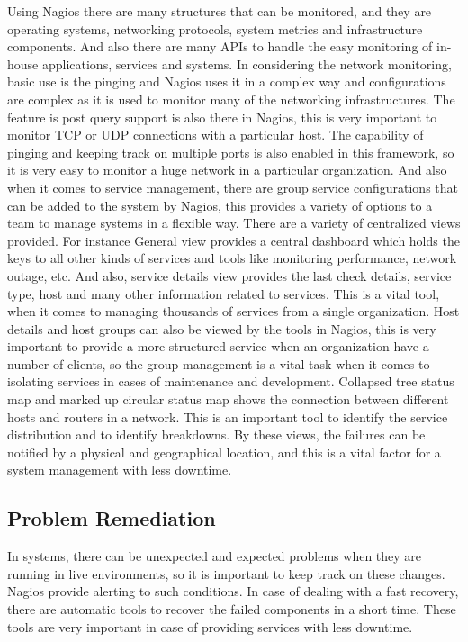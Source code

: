 \documentclass[9pt,twocolumn,twoside]{styles/osajnl}
\begin{document}
Using Nagios there are many structures that can be monitored, and they are operating systems, networking protocols, system metrics and infrastructure components. And also there are many APIs to handle the easy monitoring of in-house applications, services and systems. In considering the network monitoring, basic use is the pinging and Nagios uses it in a complex way and configurations are complex as it is used to monitor many of the networking infrastructures. The feature is post query support is also there in Nagios, this is very important to monitor TCP or UDP connections with a particular host. The capability of pinging and keeping track on multiple ports is also enabled in this framework, so it is very easy to monitor a huge network in a particular organization.  And also when it comes to service management, there are group service configurations that can be added to the system by Nagios, this provides a variety of options to a team to manage systems in a flexible way. There are a variety of centralized views provided. For instance General view provides a central dashboard which holds the keys to all other kinds of services and tools like monitoring performance, network outage, etc. And also, service details view provides the last check details, service type, host and many other information related to services. This is a vital tool, when it comes to managing thousands of services from a single organization. Host details and host groups can also be viewed by the tools in Nagios, this is very important to provide a more structured service when an organization have a number of clients, so the group management is a vital task when it comes to isolating services in cases of maintenance and development. Collapsed tree status map and marked up circular status map shows the connection between different hosts and routers in a network. This is an important tool to identify the service distribution and to identify breakdowns. By these views, the failures can be notified by a physical and geographical location, and this is a vital factor for a system management with less downtime.  

\subsection{Problem Remediation}

In systems, there can be unexpected and expected problems when they are running in live environments, so it is important to keep track on these changes. Nagios provide alerting to such conditions. In case of dealing with a fast recovery, there are automatic tools to recover the failed components in a short time. These tools are very important in case of providing services with less downtime.
\end{document}

